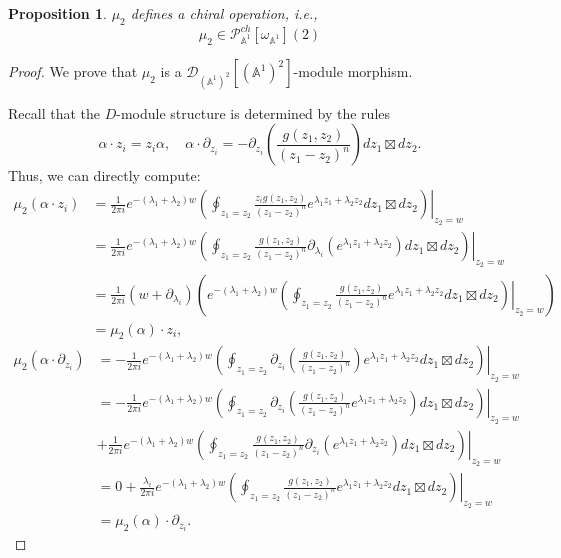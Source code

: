 \documentclass[11pt]{amsart}
\newtheorem{prop}[thm]{Proposition}
\theoremstyle{definition}
\theoremstyle{remark}
\numberwithin{equation}{section}
\renewcommand{\AA}{\mathbb{A}}
\newcommand{\cP}{\mathcal{P}}
\begin{document}
\begin{prop}
    $\mu_2$ defines a chiral operation, i.e.,
    $$    \mu_2\in \cP^{ch}_{\AA^1}[\omega_{\AA^1}](2)
    $$
\end{prop}
\begin{proof}
  We prove that $\mu_2$ is a $\mathcal{D}_{(\mathbb{A}^{1})^{2}}[(\mathbb{A}^{1})^{2}]$-module morphism.


Recall that the $D$-module structure is determined by the rules
$$
\alpha \cdot z_{i}=z_{i}\alpha,\quad
\alpha\cdot \partial_{z_{i}}=-\partial_{z_{i}}\left(\frac{g(z_{1},z_{2})}{(z_{1}-z_{2})^{n}}\right)dz_{1}\boxtimes dz_{2} .
$$
Thus, we can directly compute:
\begin{align*}
  \mu_{2}(\alpha \cdot z_{i})&=\frac{1}{2\pi i}e^{-(\lambda_{1}+\lambda_{2})w}\left. \left(\oint_{z_{1}=z_2}\frac{z_{i}g(z_{1},z_{2})}{(z_{1}-z_{2})^{n}}e^{\lambda_{1}z_{1}+\lambda_{2}z_{2}}dz_{1}\boxtimes dz_{2}\right)\right|_{z_{2}=w}\\
&=\frac{1}{2\pi i}e^{-(\lambda_{1}+\lambda_{2})w}\left. \left(\oint_{z_{1}=z_2}\frac{g(z_{1},z_{2})}{(z_{1}-z_{2})^{n}}\partial_{\lambda_{i}}\left(e^{\lambda_{1}z_{1}+\lambda_{2}z_{2}}\right)dz_{1}\boxtimes dz_{2}\right)\right|_{z_{2}=w}\\
&=\frac{1}{2\pi i}(w+\partial_{\lambda_{i}})\left(e^{-(\lambda_{1}+\lambda_{2})w}\left. \left(\oint_{z_{1}=z_2}\frac{g(z_{1},z_{2})}{(z_{1}-z_{2})^{n}}e^{\lambda_{1}z_{1}+\lambda_{2}z_{2}}dz_{1}\boxtimes dz_{2}\right)\right|_{z_{2}=w}\right)\\
&=\mu_{2}(\alpha )\cdot z_{i},
\end{align*}
\begin{align*}
  \mu_{2}(\alpha \cdot \partial_{z_{i}})&=-\frac{1}{2\pi i}e^{-(\lambda_{1}+\lambda_{2})w}\left. \left(\oint_{z_{1}=z_2}\partial_{z_{i}}\left(\frac{g(z_{1},z_{2})}{(z_{1}-z_{2})^{n}}\right)e^{\lambda_{1}z_{1}+\lambda_{2}z_{2}}dz_{1}\boxtimes dz_{2}\right)\right|_{z_{2}=w}\\
&=-\frac{1}{2\pi i}e^{-(\lambda_{1}+\lambda_{2})w}\left. \left(\oint_{z_{1}=z_2}\partial_{z_{i}}\left(\frac{g(z_{1},z_{2})}{(z_{1}-z_{2})^{n}}e^{\lambda_{1}z_{1}+\lambda_{2}z_{2}}\right)dz_{1}\boxtimes dz_{2}\right)\right|_{z_{2}=w}\\
&+\frac{1}{2\pi i}e^{-(\lambda_{1}+\lambda_{2})w}\left. \left(\oint_{z_{1}=z_2}\frac{g(z_{1},z_{2})}{(z_{1}-z_{2})^{n}}\partial_{z_{i}}\left(e^{\lambda_{1}z_{1}+\lambda_{2}z_{2}}\right)dz_{1}\boxtimes dz_{2}\right)\right|_{z_{2}=w}\\
&=0+\frac{\lambda_{i}}{2\pi i}e^{-(\lambda_{1}+\lambda_{2})w}\left. \left(\oint_{z_{1}=z_2}\frac{g(z_{1},z_{2})}{(z_{1}-z_{2})^{n}}e^{\lambda_{1}z_{1}+\lambda_{2}z_{2}}dz_{1}\boxtimes dz_{2}\right)\right|_{z_{2}=w}\\
&=\mu_{2}(\alpha )\cdot \partial_{z_{i}}.
\end{align*}
\end{proof}
\end{document}
